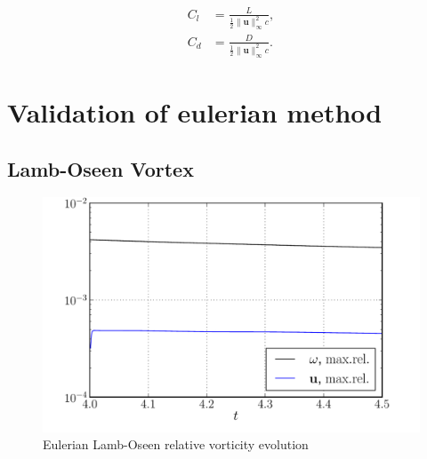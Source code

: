 		\begin{subequations}
		\begin{align}
		C_l &= \frac{L}{\frac{1}{2}\lVert\mathbf{u}\rVert_{\infty}^2 c},\\
		C_d &= \frac{D}{\frac{1}{2}\lVert\mathbf{u}\rVert_{\infty}^2 c}.
		\end{align}
		\end{subequations}

\section{Validation of eulerian method}

\subsection{Lamb-Oseen Vortex}

	\begin{figure}[b]
	\centering
	\includegraphics[width=0.7\linewidth]{./figures/eulerian/lambOseen_eulerian_wRelEvolution_compressed.pdf}
	\caption{Eulerian Lamb-Oseen relative vorticity evolution}
	\label{fig:lambOseen_eulerian_wRelEvolution}
	\end{figure}


